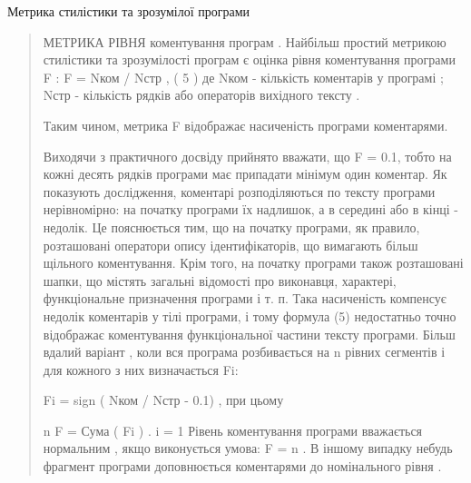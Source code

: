 \documentclass[oneside,final,14pt]{extreport}
\begin{document}
Метрика стилістики та зрозумілої програми
\begin{quote}

МЕТРИКА РІВНЯ коментування програм .
Найбільш простий метрикою стилістики та зрозумілості програм є оцінка рівня коментування програми F :
F = Nком / Nстр , ( 5 )
де Nком - кількість коментарів у програмі ; Nстр - кількість рядків або операторів вихідного тексту .

Таким чином, метрика F відображає насиченість програми коментарями.

Виходячи з практичного досвіду прийнято вважати, що F = 0.1, тобто на кожні десять рядків програми має припадати мінімум один коментар. Як показують дослідження, коментарі розподіляються по тексту програми нерівномірно: на початку програми їх надлишок, а в середині або в кінці - недолік. Це пояснюється тим, що на початку програми, як правило, розташовані оператори опису ідентифікаторів, що вимагають більш щільного коментування. Крім того, на початку програми також розташовані шапки, що містять загальні відомості про виконавця, характері, функціональне призначення програми і т. п. Така насиченість компенсує недолік коментарів у тілі програми, і тому формула (5) недостатньо точно відображає коментування функціональної частини тексту програми.
Більш вдалий варіант , коли вся програма розбивається на n рівних сегментів і для кожного з них визначається Fi:

Fi = sign ( Nком / Nстр - 0.1) ,
при цьому

n
F = Сума ( Fi ) .
i = 1
Рівень коментування програми вважається нормальним , якщо виконується умова: F = n . В іншому випадку небудь фрагмент програми доповнюється коментарями до номінального рівня .
\end{quote}
\end{document}
